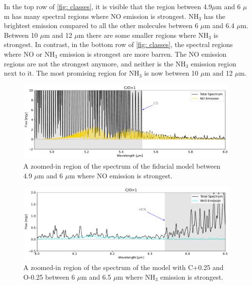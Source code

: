 \documentclass[twoside, single, authoryear, semicolon, 12pt]{lion-msc}
\newcommand{\4}{$_4$}
\newcommand{\3}{$_3$}
\newcommand{\2}{$_2$}
\begin{document}
In the top row of \autoref{fig: classes}, it is visible that the region between 4.9$\mu$m and 6 $\mu$m has many spectral regions where NO emission is strongest. NH\3 has the brightest emission compared to all the other molecules between 6 $\mu$m and 6.4 $\mu$m. Between 10 $\mu$m and 12 $\mu$m there are some smaller regions where NH\3 is strongest. In contrast, in the bottom row of \autoref{fig: classes}, the spectral regions where NO or NH\3 emission is strongest are more barren. The NO emission regions are not the strongest anymore, and neither is the NH\3 emission region next to it. The most promising region for NH\3 is now between 10 $\mu$m and 12 $\mu$m. 

\begin{figure}[H]
    \centering
    \includegraphics[width=\linewidth]{Figures/NO_region.pdf}
    \caption{A zoomed-in region of the spectrum of the fiducial model between 4.9 $\mu$m and 6 $\mu$m where NO emission is strongest.}
    \label{fig: NO region}
\end{figure}

\lipsum[2]

\begin{figure}[H]
    \centering
    \includegraphics[width=\linewidth]{Figures/NH3_region1.pdf}
    \caption{A zoomed-in region of the spectrum of the model with C+0.25 and O-0.25 between 6 $\mu$m and 6.5 $\mu$m where NH\3 emission is strongest.}
    \label{fig: NH3 region 1}
\end{figure}

\lipsum[2]
\end{document}
